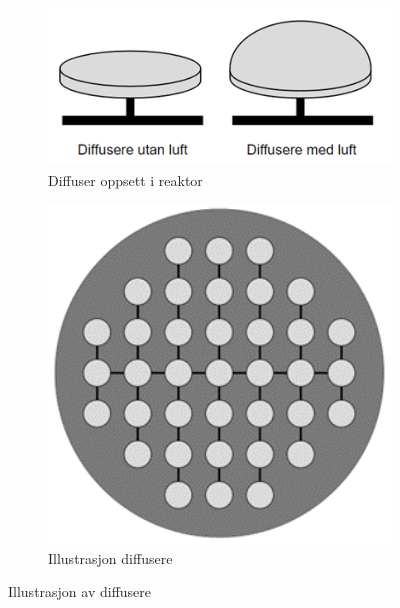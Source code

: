 \begin{figure}[htbp]
    \centering
    \begin{subfigure}[b]{0.3\textwidth}
        \centering
        \includegraphics[width=1\textwidth]{Figurar/DiffusereMedOgUtanLuft.png}
        \caption{Diffuser oppsett i reaktor}\label{fig:subfig1}
    \end{subfigure}
    \hfill
    \begin{subfigure}[b]{0.3\textwidth}
        \centering
        \includegraphics[width=1\textwidth]{Figurar/DiffuserFraTopp.png}
        \caption{Illustrasjon diffusere}\label{fig:subfig2}
    \end{subfigure}
    \caption{Illustrasjon av diffusere}\label{fig:Illustrasjon-Diffuser}
\end{figure}

